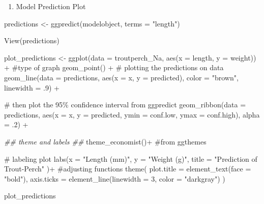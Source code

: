 \documentclass[
  letterpaper,
  DIV=11,
  numbers=noendperiod]{scrartcl}
\newenvironment{Shaded}{\begin{snugshade}}{\end{snugshade}}
\newcommand{\AttributeTok}[1]{\textcolor[rgb]{0.40,0.45,0.13}{#1}}
\newcommand{\CommentTok}[1]{\textcolor[rgb]{0.37,0.37,0.37}{#1}}
\newcommand{\DecValTok}[1]{\textcolor[rgb]{0.68,0.00,0.00}{#1}}
\newcommand{\DocumentationTok}[1]{\textcolor[rgb]{0.37,0.37,0.37}{\textit{#1}}}
\newcommand{\FunctionTok}[1]{\textcolor[rgb]{0.28,0.35,0.67}{#1}}
\newcommand{\NormalTok}[1]{\textcolor[rgb]{0.00,0.23,0.31}{#1}}
\newcommand{\OtherTok}[1]{\textcolor[rgb]{0.00,0.23,0.31}{#1}}
\newcommand{\SpecialCharTok}[1]{\textcolor[rgb]{0.37,0.37,0.37}{#1}}
\newcommand{\StringTok}[1]{\textcolor[rgb]{0.13,0.47,0.30}{#1}}
\providecommand{\tightlist}{%
  \setlength{\itemsep}{0pt}\setlength{\parskip}{0pt}}\usepackage{longtable,booktabs,array}
\begin{document}
\begin{enumerate}
\def\labelenumi{\arabic{enumi}.}
\setcounter{enumi}{9}
\tightlist
\item
  Model Prediction Plot
\end{enumerate}

\begin{Shaded}
\begin{Highlighting}[]
\NormalTok{predictions }\OtherTok{\textless{}{-}} \FunctionTok{ggpredict}\NormalTok{(modelobject, }\AttributeTok{terms =} \StringTok{"length"}\NormalTok{)}

\FunctionTok{View}\NormalTok{(predictions)}
\end{Highlighting}
\end{Shaded}

\begin{Shaded}
\begin{Highlighting}[]
\NormalTok{plot\_predictions }\OtherTok{\textless{}{-}} \FunctionTok{ggplot}\NormalTok{(}\AttributeTok{data =}\NormalTok{ troutperch\_Na, }
                           \FunctionTok{aes}\NormalTok{(}\AttributeTok{x =}\NormalTok{ length, }\AttributeTok{y =}\NormalTok{ weight)) }\SpecialCharTok{+}
  \CommentTok{\#type of graph   }
  \FunctionTok{geom\_point}\NormalTok{() }\SpecialCharTok{+}
  \CommentTok{\# plotting the predictions on data }
  \FunctionTok{geom\_line}\NormalTok{(}\AttributeTok{data =}\NormalTok{ predictions, }
            \FunctionTok{aes}\NormalTok{(}\AttributeTok{x =}\NormalTok{ x, }\AttributeTok{y =}\NormalTok{ predicted), }
            \AttributeTok{color =} \StringTok{"brown"}\NormalTok{, }\AttributeTok{linewidth =}\NormalTok{ .}\DecValTok{9}\NormalTok{) }\SpecialCharTok{+}
  
  \CommentTok{\# then plot the 95\% confidence interval from ggpredict}
  \FunctionTok{geom\_ribbon}\NormalTok{(}\AttributeTok{data =}\NormalTok{ predictions, }
              \FunctionTok{aes}\NormalTok{(}\AttributeTok{x =}\NormalTok{ x, }\AttributeTok{y =}\NormalTok{ predicted, }\AttributeTok{ymin =}\NormalTok{ conf.low, }\AttributeTok{ymax =}\NormalTok{ conf.high), }
              \AttributeTok{alpha =}\NormalTok{ .}\DecValTok{2}\NormalTok{) }\SpecialCharTok{+}
  
  \DocumentationTok{\#\# theme and labels \#\#}
 \FunctionTok{theme\_economist}\NormalTok{()}\SpecialCharTok{+} \CommentTok{\#from ggthemes }
  
 \CommentTok{\# labeling plot }
 \FunctionTok{labs}\NormalTok{(}\AttributeTok{x =} \StringTok{"Length (mm)"}\NormalTok{,}
      \AttributeTok{y =} \StringTok{"Weight (g)"}\NormalTok{,}
      \AttributeTok{title =} \StringTok{"Prediction of Trout{-}Perch"}
\NormalTok{      )}\SpecialCharTok{+} 
  \CommentTok{\#adjusting functions }
  \FunctionTok{theme}\NormalTok{(}
    \AttributeTok{plot.title =} \FunctionTok{element\_text}\NormalTok{(}\AttributeTok{face =} \StringTok{"bold"}\NormalTok{),}
    \AttributeTok{axis.ticks =} \FunctionTok{element\_line}\NormalTok{(}\AttributeTok{linewidth =} \DecValTok{3}\NormalTok{, }\AttributeTok{color =} \StringTok{"darkgray"}\NormalTok{)}
\NormalTok{  )}
 
\NormalTok{plot\_predictions}
\end{Highlighting}
\end{Shaded}
\end{document}
